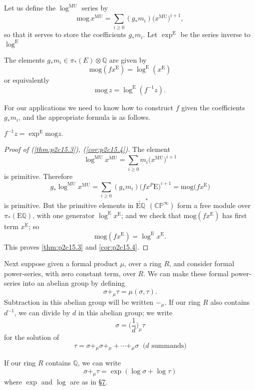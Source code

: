 \documentclass[../main]{subfiles}
\begin{document}
Let us define the $\log^{\mathrm{MU}}$ series by \[\mathrm{mog}\, x^{\mathrm{MU}}=\sum_{i\geq0}(g_\ast m_i)\big(x^{\mathrm{MU}}\big)^{i+1},\] so that it serves to store the coefficients $g_\ast m_i$. Let $\exp^{\mathrm{E}}$ be the series inverse to $\log^{\mathrm{E}}$

\begin{proposition}
\label{thm:p2c15.3}
The elements $g_\ast m_i\in\pi_\ast(E)\otimes\mathbb{Q}$ are given by \[\mathrm{mog}(f x^{\mathrm E}) = \log^{\mathrm E} (x^{\mathrm E})\] or equivalently \[\mathrm{mog}\, z=\log^{\mathrm{E}}(f^{-1}z).\]
\end{proposition}
For our applications we need to know how to construct $f$ given the coefficients $g_\ast m_i$, and the appropriate formula is as follows.
\begin{corollary}
\label{cor:p2c15.4}
$f^{-1}z=\exp^{\mathrm{E}}\mathrm{mog}z.$
\end{corollary} 
\begin{proof}[Proof of (\ref{thm:p2c15.3}), (\ref{cor:p2c15.4})]
The element \[\log^{\mathrm{MU}}x^{\mathrm{MU}}=\sum_{i\geq0}m_i\big(x^{\mathrm{MU}}\big)^{i+1}\] is primitive. Therefore \[g_\ast \log^{\mathrm{MU}}x^{\mathrm{MU}}=\sum_{i\geq0}(g_\ast m_i)\big(fx^P\mathrm{E}\big)^{i+1}=\mathrm{mog}\big(fx^{\mathrm{E}}\big)\] is primitive. But the primitive elements in $\tilde{\mathrm{E}\mathbb{Q}}^\ast(\mathbb{CP}^\infty)$ form a free module over $\pi_\ast(\mathrm{E}\mathbb{Q})$, with one generator $\log^{\mathrm{E}}x^{\mathrm{E}}$; and we check that $\mathrm{mog}(fx^{\mathrm{E}})$ has first term $x^{\mathrm{E}}$; so \[\mathrm{mog}(fx^{\mathrm{E}})=\log^{\mathrm{E}} x^{\mathrm{E}}.\] This proves \eqref{thm:p2c15.3} and \eqref{cor:p2c15.4}.
\end{proof}

Next suppose given a formal product $\mu$, over a ring $R$, and consider formal power-series, with zero constant term, over $R$. We can make these formal power-series into an abelian group by defining \[\sigma+_\mu\tau=\mu(\sigma,\tau).\] Subtraction in this abelian group will be written $-_\mu$. If our ring $R$ also contains $d^{-1}$, we can divide by $d$ in this abelian group; we write \[\sigma=\Big(\dfrac1d\Big)_\mu\tau\] for the solution of \[\tau=\sigma+_\mu\sigma+_\mu+\cdots+_\mu\sigma\:\text{ ($d$ summands)}\]

If our ring $R$ contains $\mathbb{Q}$, we can write \[\sigma+_\mu\tau=\exp(\log\sigma+\log\tau)\] where $\exp$ and $\log$ are as in \hyperref[sec:p2c7]{\S 7}.
\end{document}
